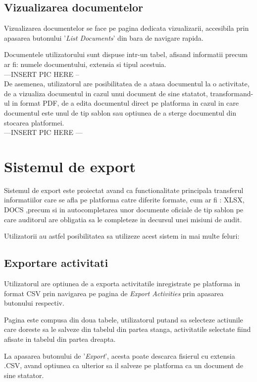 \subsection*{Vizualizarea documentelor}

Vizualizarea documentelor se face pe pagina dedicata vizualizarii, accesibila prin apasarea butonului
'\textit{List Documents}' din bara de navigare rapida.

Documentele utilizatorului sunt dispuse intr-un tabel, afisand informatii precum ar fi: numele documentului, extensia si tipul acestuia.\\

---INSERT PIC HERE --\\
De asemenea, utilizatorul are posibilitatea de a atasa documentul la o activitate, de a vizualiza documentul in cazul unui document de sine statatot, transformand-ul in format PDF, de a edita documentul direct pe platforma in cazul in care documentul este unul de tip sablon sau optiunea de a sterge documentul din stocarea platformei.\\

---INSERT PIC HERE ---



\section{Sistemul de export}

Sistemul de export este proiectat avand ca functionalitate principala transferul informatiilor care se afla pe platforma catre diferite formate, cum ar fi : XLSX, DOCS ,precum si in autocompletarea unor documente oficiale de tip sablon pe care auditorul are obligatia sa le completeze in decursul unei misiuni de audit.

Utilizatorii au astfel posibilitatea sa utilizeze acest sistem in mai multe feluri:
\subsection*{Exportare activitati}
Utilizatorul are optiunea de a exporta activitatile inregistrate pe platforma in format CSV prin navigarea pe pagina de \textit{Export Activities} prin apasarea butonului respectiv.

Pagina este compusa din doua tabele, utilizatorul putand sa selecteze actiunile care doreste sa le salveze din tabelul din partea stanga, activitatile selectate fiind afisate in tabelul din partea dreapta.

La apasarea butonului de '\textit{Export}', acesta poate descarca fisierul cu extensia .CSV, avand optiunea ca ulterior sa il salveze pe platforma ca un document de sine statator.\\

